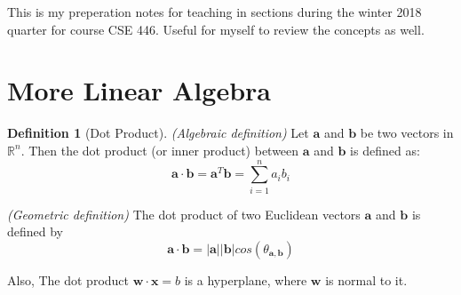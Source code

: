 \documentclass[12pt]{article}
\title{}
\theoremstyle{definition}
\newtheorem{definition}{Definition}[section]
\begin{document}
\pagestyle{fancy}
\fancyhf{} %
\cfoot{\thepage}
\renewcommand{\headrulewidth}{1pt}

This is my preperation notes for teaching in sections during the winter 2018 quarter for course CSE 446. Useful for myself to review the concepts as well.

\section{More Linear Algebra}

\begin{definition}[Dot Product]
\emph{(Algebraic definition)} Let $\bm{a}$ and $\bm{b}$ be two vectors in $\mathbb{R}^n$. Then the dot product (or inner product) between $\bm{a}$ and $\bm{b}$ is defined as:
    \begin{equation}
        \bm{a}\cdot\bm{b}=\bm{a}^T\bm{b}=\sum_{i=1}^{n}a_ib_i
    \end{equation}
    
\emph{(Geometric definition)}  The dot product of two Euclidean vectors $\bm{a}$ and $\bm{b}$ is defined by
    \begin{equation}
        \bm{a}\cdot\bm{b}=|\bm{a}||\bm{b}|cos(\theta_{\bm{a},\bm{b}})
    \end{equation}
    
Also, The dot product $\bm{w}\cdot\bm{x}=b$ is a hyperplane, where $\bm{w}$ is normal to it.
\end{definition}
\end{document}
